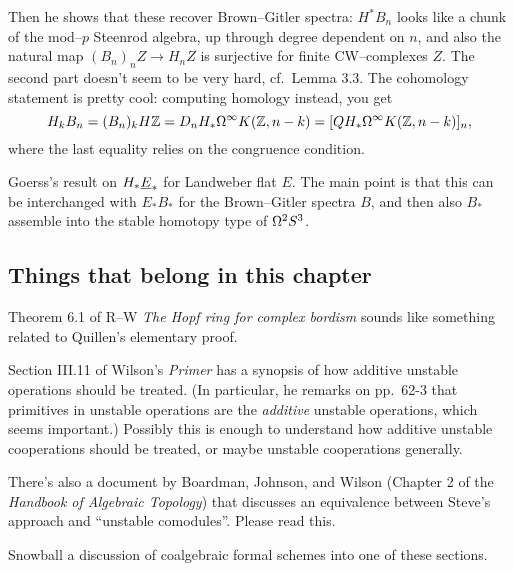 Then he shows that these recover Brown--Gitler spectra: $H^* B_n$ looks like a chunk of the mod--$p$ Steenrod algebra, up through degree dependent on $n$, and also the natural map $(B_n)_n Z \to H_n Z$ is surjective for finite CW--complexes $Z$.  The second part doesn't seem to be very hard, cf.\ Lemma 3.3.  The cohomology statement is pretty cool: computing homology instead, you get \[H_k B_n = (B_n)_k H\mathbb Z = D_n H_* \Omega^\infty K(\mathbb Z, n - k) = [Q H_* \Omega^\infty K(\mathbb Z, n-k)]_n,\] where the last equality relies on the congruence condition.



Goerss's result on $H_* \underline{\smash{E}}_{*}$ for Landweber flat $E$.  The main point is that this can be interchanged with $E_* B_*$ for the Brown--Gitler spectra $B$, and then also $B_*$ assemble into the stable homotopy type of $\Omega^2 S^3$.











\subsection*{Things that belong in this chapter}

Theorem 6.1 of R--W \textit{The Hopf ring for complex bordism} sounds like something related to Quillen's elementary proof.

Section III.11 of Wilson's \textit{Primer} has a synopsis of how additive unstable operations should be treated.  (In particular, he remarks on pp.\ 62-3 that primitives in unstable operations are the \emph{additive} unstable operations, which seems important.)  Possibly this is enough to understand how additive unstable cooperations should be treated, or maybe unstable cooperations generally.

There's also a document by Boardman, Johnson, and Wilson (Chapter 2 of the \textit{Handbook of Algebraic Topology}) that discusses an equivalence between Steve's approach and ``unstable comodules''.  Please read this.

Snowball a discussion of coalgebraic formal schemes into one of these sections.





